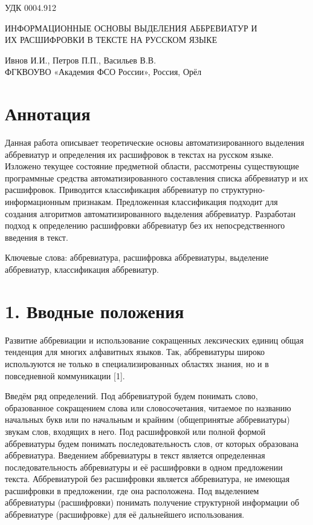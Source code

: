 \documentclass{article}
\begin{document}
\begin{textblock}
УДК 0004.912
\end{textblock}
\begin{center}
\bigskip
\noindent
ИНФОРМАЦИОННЫЕ ОСНОВЫ ВЫДЕЛЕНИЯ АББРЕВИАТУР И\\
ИХ РАСШИФРОВКИ В ТЕКСТЕ НА РУССКОМ ЯЗЫКЕ

\end{center}
\begin{center}
\bigskip
\noindent
Ивнов И.И., Петров П.П., Васильев В.В.\\
ФГКВОУВО «Академия ФСО России»,
Россия, Орёл
\end{center}
\section*{Аннотация}
Данная работа описывает теоретические основы автоматизированного выделения аббревиатур и определения их расшифровок в текстах на русском языке. Изложено текущее состояние предметной области, рассмотрены существующие программные средства автоматизированного составления списка аббревиатур и их расшифровок. Приводится классификация аббревиатур по структурно-информационным признакам. Предложенная классификация подходит для создания алгоритмов автоматизированного выделения аббревиатур. Разработан подход к определению расшифровки аббревиатур без их непосредственного введения в текст.

\noindent Ключевые слова: аббревиатура, расшифровка аббревиатуры, выделение аббревиатур, классификация аббревиатур.

\section*{1. Вводные положения}
Развитие аббревиации и использование сокращенных лексических единиц общая тенденция для многих алфавитных языков. Так, аббревиатуры широко используются не только в специализированных областях знания, но и в повседневной коммуникации [1].

Введём ряд определений. Под аббревиатурой будем понимать слово, образованное сокращением слова или словосочетания, читаемое по названию начальных букв или по начальным и крайним (общепринятые аббревиатуры) звукам слов, входящих в него. Под расшифровкой или полной формой аббревиатуры будем понимать последовательность слов, от которых образована аббревиатура. Введением аббревиатуры в текст является определенная последовательность аббревиатуры и её расшифровки в одном предложении текста. Аббревиатурой без расшифровки является аббревиатура, не имеющая расшифровки в предложении, где она расположена. Под выделением аббревиатуры (расшифровки)
 понимать получение структурной информации об аббревиатуре (расшифровке) для её дальнейшего использования.
\end{document}
